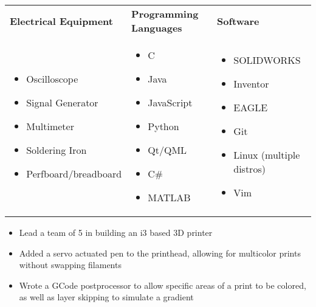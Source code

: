 \documentclass{resume}
\author{Jasper Chan}
\begin{document}
\maketitle

\TechnicalSkills
\begin{table}[H]
	\centering
	\begin{tabularx}{\textwidth}{X X X}
		\textbf{Electrical Equipment} & \textbf{Programming Languages} & \textbf{Software} \\
		\begin{itemize}
			\item Oscilloscope
			\item Signal Generator
			\item Multimeter
			\item Soldering Iron
			\item Perfboard/breadboard
		\end{itemize} &
		\begin{itemize}
			\item C
			\item Java
			\item JavaScript
			\item Python
			\item Qt/QML
			\item C\#
			\item MATLAB
		\end{itemize} &
		\begin{itemize}
			\item SOLIDWORKS
			\item Inventor
			\item EAGLE
			\item Git
			\item Linux (multiple distros)
			\item Vim
		\end{itemize}
	\end{tabularx}
\end{table}
\vspace{-4em} %
\CoopStatus


\TechnicalProjects

\begin{itemize}
	\item Lead a team of 5 in building an i3 based 3D printer
	\item Added a servo actuated pen to the printhead, allowing for multicolor prints without swapping filaments
	\item Wrote a GCode postprocessor to allow specific areas of a print to be colored, as well as layer skipping to simulate a gradient
\end{itemize}
\end{document}
